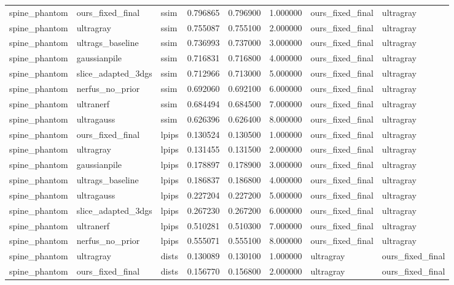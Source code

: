 \begin{tabular}{llllllll}
spine\_phantom & ours\_fixed\_final & ssim & 0.796865 & 0.796900 & 1.000000 & ours\_fixed\_final & ultragray \\
spine\_phantom & ultragray & ssim & 0.755087 & 0.755100 & 2.000000 & ours\_fixed\_final & ultragray \\
spine\_phantom & ultrags\_baseline & ssim & 0.736993 & 0.737000 & 3.000000 & ours\_fixed\_final & ultragray \\
spine\_phantom & gaussianpile & ssim & 0.716831 & 0.716800 & 4.000000 & ours\_fixed\_final & ultragray \\
spine\_phantom & slice\_adapted\_3dgs & ssim & 0.712966 & 0.713000 & 5.000000 & ours\_fixed\_final & ultragray \\
spine\_phantom & nerfus\_no\_prior & ssim & 0.692060 & 0.692100 & 6.000000 & ours\_fixed\_final & ultragray \\
spine\_phantom & ultranerf & ssim & 0.684494 & 0.684500 & 7.000000 & ours\_fixed\_final & ultragray \\
spine\_phantom & ultragauss & ssim & 0.626396 & 0.626400 & 8.000000 & ours\_fixed\_final & ultragray \\
spine\_phantom & ours\_fixed\_final & lpips & 0.130524 & 0.130500 & 1.000000 & ours\_fixed\_final & ultragray \\
spine\_phantom & ultragray & lpips & 0.131455 & 0.131500 & 2.000000 & ours\_fixed\_final & ultragray \\
spine\_phantom & gaussianpile & lpips & 0.178897 & 0.178900 & 3.000000 & ours\_fixed\_final & ultragray \\
spine\_phantom & ultrags\_baseline & lpips & 0.186837 & 0.186800 & 4.000000 & ours\_fixed\_final & ultragray \\
spine\_phantom & ultragauss & lpips & 0.227204 & 0.227200 & 5.000000 & ours\_fixed\_final & ultragray \\
spine\_phantom & slice\_adapted\_3dgs & lpips & 0.267230 & 0.267200 & 6.000000 & ours\_fixed\_final & ultragray \\
spine\_phantom & ultranerf & lpips & 0.510281 & 0.510300 & 7.000000 & ours\_fixed\_final & ultragray \\
spine\_phantom & nerfus\_no\_prior & lpips & 0.555071 & 0.555100 & 8.000000 & ours\_fixed\_final & ultragray \\
spine\_phantom & ultragray & dists & 0.130089 & 0.130100 & 1.000000 & ultragray & ours\_fixed\_final \\
spine\_phantom & ours\_fixed\_final & dists & 0.156770 & 0.156800 & 2.000000 & ultragray & ours\_fixed\_final \\

\end{tabular}
